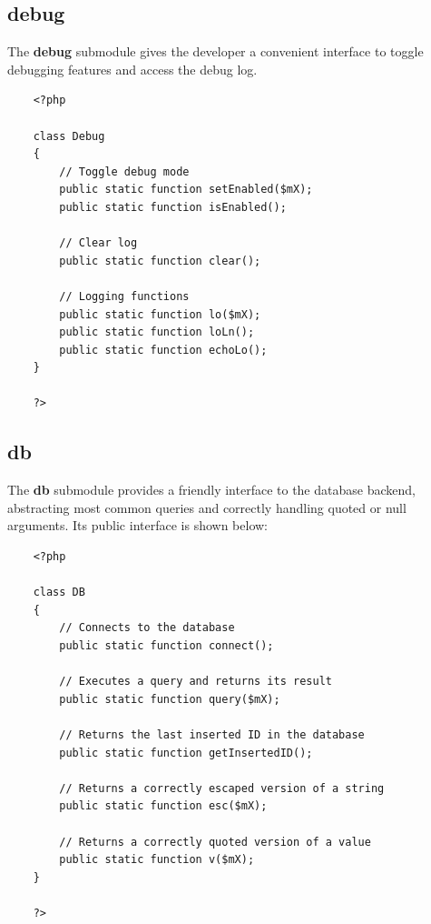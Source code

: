 \documentclass[12pt]{report}
\renewcommand\emph{\textbf}
\begin{document}
                \subsection{debug}

                    The \emph{debug} submodule gives the developer a convenient interface to toggle debugging features and access the debug log.

                    \begin{verbatim}
    <?php

    class Debug
    {
        // Toggle debug mode
        public static function setEnabled($mX);
        public static function isEnabled();

        // Clear log
        public static function clear();

        // Logging functions
        public static function lo($mX);
        public static function loLn();
        public static function echoLo();
    }

    ?>
                        \end{verbatim}


                \subsection{db}

                     The \emph{db} submodule provides a friendly interface to the database backend, abstracting most common queries and correctly handling quoted or null arguments.
                     Its public interface is shown below:

                    \begin{verbatim}
    <?php

    class DB
    {
        // Connects to the database
        public static function connect();

        // Executes a query and returns its result
        public static function query($mX);

        // Returns the last inserted ID in the database
        public static function getInsertedID();

        // Returns a correctly escaped version of a string
        public static function esc($mX);

        // Returns a correctly quoted version of a value
        public static function v($mX);
    }

    ?>
                    \end{verbatim}
\end{document}
